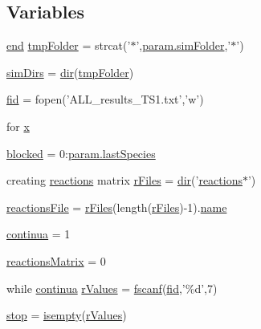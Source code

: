 \subsection*{Variables}
\begin{DoxyCompactItemize}
\item 
\hyperlink{a00025_afb358f48b1646c750fb9da6c6585be2b}{end} \hyperlink{a00029_ad509473eed851f9f5ff4157c02ec8618}{tmp\+Folder} = strcat('$\ast$',\hyperlink{a00032_aa671e3345005bd599e662bcaa115b18a}{param.\+sim\+Folder},'$\ast$')
\item 
\hyperlink{a00029_aae5035eb84b89176ed5b06e136325eff}{sim\+Dirs} = \hyperlink{a00113_a4ca269cf93df1b512b52174c1a256fe5}{dir}(\hyperlink{a00029_ad509473eed851f9f5ff4157c02ec8618}{tmp\+Folder})
\item 
\hyperlink{a00029_ae9011d40c6f13e68e6f07156e0da7c5d}{fid} = fopen('A\+L\+L\+\_\+results\+\_\+\+T\+S1.\+txt','w')
\item 
for \hyperlink{a00029_a7265972fe485274cfff77a9bb07b8fce}{x}
\item 
\hyperlink{a00029_a1faaaae288fc8ca4ed1751049aa2f84f}{blocked} = 0\+:\hyperlink{a00032_aad7be196243f3c9ca83dfee7c9111014}{param.\+last\+Species}
\item 
creating \hyperlink{a00020}{reactions} matrix \hyperlink{a00029_ad75735665492cabd747370126464fddf}{r\+Files} = \hyperlink{a00113_a4ca269cf93df1b512b52174c1a256fe5}{dir}('\hyperlink{a00020}{reactions}$\ast$')
\item 
\hyperlink{a00029_a4c72dba1fe2ee2fbcc699262a8d0c624}{reactions\+File} = \hyperlink{a00030_ad75735665492cabd747370126464fddf}{r\+Files}(length(\hyperlink{a00030_ad75735665492cabd747370126464fddf}{r\+Files})-\/1).\hyperlink{a00027_abbf559a76fab59203496b0847ab9502a}{name}
\item 
\hyperlink{a00029_a9c951ebd5bc3f1adce943bee1255f4d6}{continua} = 1
\item 
\hyperlink{a00029_ac52097a2745fcef31eb175d2e9485845}{reactions\+Matrix} = 0
\item 
while \hyperlink{a00030_a9c951ebd5bc3f1adce943bee1255f4d6}{continua} \hyperlink{a00029_a436a6968124e560649654a4abbd9dac6}{r\+Values} = \hyperlink{a00025_a028ac102a731e62fb0a7439381f566c1}{fscanf}(\hyperlink{a00031_ae9011d40c6f13e68e6f07156e0da7c5d}{fid},'\%d',7)
\item 
\hyperlink{a00029_a6bd08e37edf4151f5f6d1fc27a6f227a}{stop} = \hyperlink{a00025_ac10445404f4b83302522defb59e25ef7}{isempty}(\hyperlink{a00030_a436a6968124e560649654a4abbd9dac6}{r\+Values})
\item 

\end{DoxyCompactItemize}
